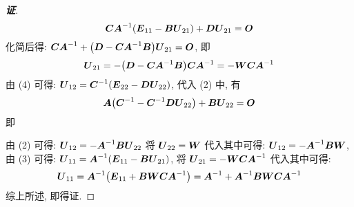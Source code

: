 \begin{proof}[{\songti \textbf{证}}]
    $$\vb*{CA}^{-1}(\vb*{E}_{11}-\vb*{BU}_{21})+\vb*{DU}_{21}=\vb*{O}$$
    化简后得: $\vb*{CA}^{-1}+\qty(\vb*{D}-\vb*{CA}^{-1}\vb*{B})\vb*{U}_{21}=\vb*{O}$, 即
    $$\vb*{U}_{21}=-\qty(\vb*{D}-\vb*{CA}^{-1}\vb*{B})\vb*{CA}^{-1}=-\vb*{WCA}^{-1}$$
    由 (4) 可得: $\vb*{U}_{12}=\vb*{C}^{-1}(\vb*{E}_{22}-\vb*{DU}_{22})$, 代入 (2) 中, 有
    $$\vb*{A}\qty(\vb*{C}^{-1}-\vb*{C}^{-1}\vb*{DU}_{22})+\vb*{BU}_{22}=\vb*{O}$$
    即
    由 (2) 可得: $\vb*{U}_{12}=-\vb*{A}^{-1}\vb*{BU}_{22}$ 将 $\vb*{U}_{22}=\vb*{W}$ 代入其中可得: $\vb*{U}_{12}=-\vb*{A}^{-1}\vb*{BW}$, 由 (3) 可得:
    $\vb*{U}_{11}=\vb*{A}^{-1}(\vb*{E}_{11}-\vb*{BU}_{21})$, 将 $\vb*{U}_{21}=-\vb*{WCA}^{-1}$ 代入其中可得:
    $$\vb*{U}_{11}=\vb*{A}^{-1}\qty(\vb*{E}_{11}+\vb*{BWCA}^{-1})=\vb*{A}^{-1}+\vb*{A}^{-1}\vb*{BWCA}^{-1}$$
    综上所述, 即得证.
\end{proof}

